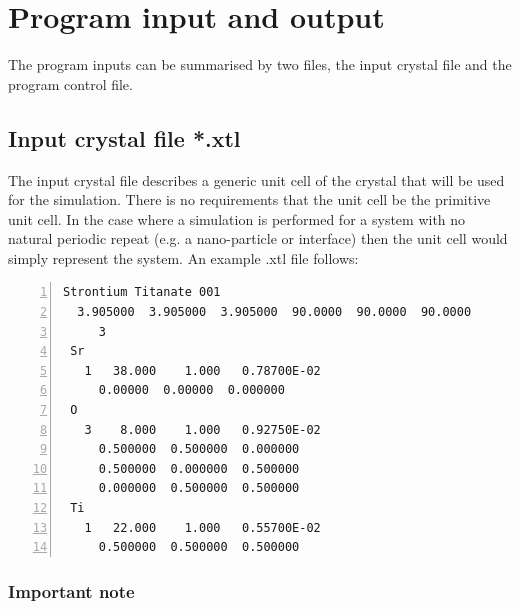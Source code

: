 \documentclass[12pt,a4paper]{article}
\begin{document}






\section{Program input and output}

The program inputs can be summarised by two files, the input crystal file and the program control file.

\subsection{Input crystal file *.xtl}
\label{xtl_input}

The input crystal file describes a generic unit cell of the crystal that will be used for the simulation.
There is no requirements that the unit cell be the primitive unit cell.
In the case where a simulation is performed for a system with no natural periodic repeat (e.g. a nano-particle or interface) then the unit cell would simply represent the system.
An example .xtl file follows: 
%
\begin{lstlisting}[language={},numbers=left,numberstyle=\tiny]
 Strontium Titanate 001
  3.905000  3.905000  3.905000  90.0000  90.0000  90.0000
     3
 Sr
   1   38.000    1.000   0.78700E-02
     0.00000  0.00000  0.000000
 O 
   3    8.000    1.000   0.92750E-02
     0.500000  0.500000  0.000000
     0.500000  0.000000  0.500000
     0.000000  0.500000  0.500000
 Ti
   1   22.000    1.000   0.55700E-02
     0.500000  0.500000  0.500000
\end{lstlisting}

\subsubsection{Important note} 
\end{document}
